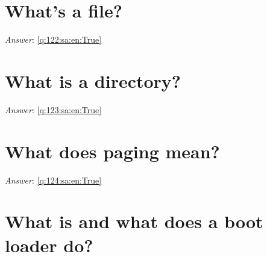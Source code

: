 \documentclass[a4paper,11pt,oneside]{book}
\begin{document}
\begin{sloppypar}
\section{What's a file?}

\label{q:122:sa:en:False}

\vspace{2cm}

\noindent\makebox[\textwidth]{\hrulefill}

\vspace{1cm}

\textit{Answer}: \autoref{q:122:sa:en:True}



\section{What is a directory?}

\label{q:123:sa:en:False}

\vspace{2cm}

\noindent\makebox[\textwidth]{\hrulefill}

\vspace{1cm}

\textit{Answer}: \autoref{q:123:sa:en:True}



\section{What does paging mean?}

\label{q:124:sa:en:False}

\vspace{2cm}

\noindent\makebox[\textwidth]{\hrulefill}

\vspace{1cm}

\textit{Answer}: \autoref{q:124:sa:en:True}



\section{What is and what does a boot loader do?}

\label{q:125:sa:en:False}

\vspace{2cm}

\noindent\makebox[\textwidth]{\hrulefill}

\vspace{1cm}


\end{sloppypar}
\end{document}
